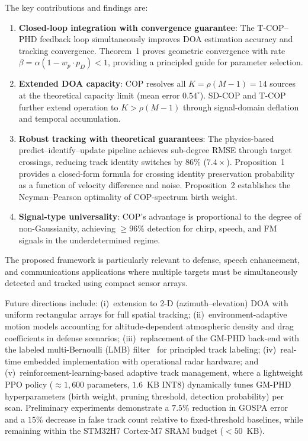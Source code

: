 \documentclass[journal]{IEEEtran}
\begin{document}
The key contributions and findings are:
\begin{enumerate}
\item \textbf{Closed-loop integration with convergence guarantee}: The T-COP--PHD feedback loop simultaneously improves DOA estimation accuracy and tracking convergence. Theorem~1 proves geometric convergence with rate $\beta = \alpha(1 - w_p \cdot p_D) < 1$, providing a principled guide for parameter selection.
\item \textbf{Extended DOA capacity}: COP resolves all $K{=}\rho(M{-}1){=}14$ sources at the theoretical capacity limit (mean error $0.54^\circ$). SD-COP and T-COP further extend operation to $K > \rho(M{-}1)$ through signal-domain deflation and temporal accumulation.
\item \textbf{Robust tracking with theoretical guarantees}: The physics-based predict--identify--update pipeline achieves sub-degree RMSE through target crossings, reducing track identity switches by $86\%$ ($7.4\times$). Proposition~1 provides a closed-form formula for crossing identity preservation probability as a function of velocity difference and noise. Proposition~2 establishes the Neyman--Pearson optimality of COP-spectrum birth weight.
\item \textbf{Signal-type universality}: COP's advantage is proportional to the degree of non-Gaussianity, achieving $\geq 96\%$ detection for chirp, speech, and FM signals in the underdetermined regime.
\end{enumerate}

The proposed framework is particularly relevant to defense, speech enhancement, and communications applications where multiple targets must be simultaneously detected and tracked using compact sensor arrays.

Future directions include: (i)~extension to 2-D (azimuth--elevation) DOA with uniform rectangular arrays for full spatial tracking; (ii)~environment-adaptive motion models accounting for altitude-dependent atmospheric density and drag coefficients in defense scenarios; (iii)~replacement of the GM-PHD back-end with the labeled multi-Bernoulli (LMB) filter~\cite{vo2014lmb} for principled track labeling; (iv)~real-time embedded implementation with operational radar hardware; and (v)~reinforcement-learning-based adaptive track management, where a lightweight PPO policy (${\approx}1{,}600$ parameters, $1.6$~KB INT8) dynamically tunes GM-PHD hyperparameters (birth weight, pruning threshold, detection probability) per scan. Preliminary experiments demonstrate a $7.5\%$ reduction in GOSPA error and a $15\%$ decrease in false track count relative to fixed-threshold baselines, while remaining within the STM32H7 Cortex-M7 SRAM budget ($<50$~KB).
\end{document}
